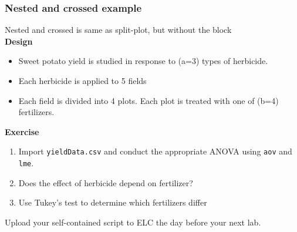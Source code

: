 \documentclass[color=usenames,dvipsnames]{beamer}\usepackage[]{graphicx}\usepackage[]{color}
\newcommand{\inr}[1]{\colorbox{inlinecolor}{\texttt{#1}}}
\begin{document}
\begin{frame}[fragile]
  \frametitle{Nested and crossed example}

{%
  \large
  Nested and crossed is same as split-plot, but without the
  block \\}
\pause
\vfill
{\bf Design}
\begin{itemize}%
  \item Sweet potato yield is studied in response to (a=3)
    types of herbicide.
  \item Each herbicide is applied to 5 fields
  \item Each field is divided into 4 plots. Each plot is treated with
    one of (b=4) fertilizers.
\end{itemize}
\pause
\vfill
{\bf Exercise}
\begin{enumerate}[(1)]%
  \item Import {\tt yieldData.csv} and conduct
    the appropriate ANOVA using \inr{aov} and \inr{lme}.
  \item Does the effect of herbicide depend on fertilizer?
  \item Use Tukey's test to determine which fertilizers differ
\end{enumerate}
\vfill
\small
Upload your self-contained script to ELC the day before your next
lab. \\
\end{frame}






\end{document}
